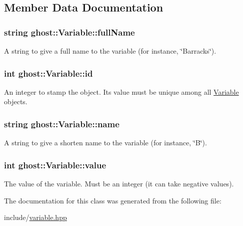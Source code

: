 \subsection{Member Data Documentation}
\hypertarget{classghost_1_1Variable_a87dc1fa73726f887a7ecbd5b9bfa7cab}{
\subsubsection[{full\-Name}]{\setlength{\rightskip}{0pt plus 5cm}string ghost\-::\-Variable\-::full\-Name\hspace{0.3cm}{\ttfamily [protected]}}}\label{classghost_1_1Variable_a87dc1fa73726f887a7ecbd5b9bfa7cab}


A string to give a full name to the variable (for instance, \char`\"{}\-Barracks\char`\"{}). 

\hypertarget{classghost_1_1Variable_a3b1cd0e87cecbb58e115a9000be26f28}{
\subsubsection[{id}]{\setlength{\rightskip}{0pt plus 5cm}int ghost\-::\-Variable\-::id\hspace{0.3cm}{\ttfamily [protected]}}}\label{classghost_1_1Variable_a3b1cd0e87cecbb58e115a9000be26f28}


An integer to stamp the object. Its value must be unique among all \hyperlink{classghost_1_1Variable}{Variable} objects. 

\hypertarget{classghost_1_1Variable_a05cf4a4cd3a5c033028e0b0f11d1dafd}{
\subsubsection[{name}]{\setlength{\rightskip}{0pt plus 5cm}string ghost\-::\-Variable\-::name\hspace{0.3cm}{\ttfamily [protected]}}}\label{classghost_1_1Variable_a05cf4a4cd3a5c033028e0b0f11d1dafd}


A string to give a shorten name to the variable (for instance, \char`\"{}\-B\char`\"{}). 

\hypertarget{classghost_1_1Variable_a4623be8dd7ed2a0cb7033aec42033cb7}{
\subsubsection[{value}]{\setlength{\rightskip}{0pt plus 5cm}int ghost\-::\-Variable\-::value\hspace{0.3cm}{\ttfamily [protected]}}}\label{classghost_1_1Variable_a4623be8dd7ed2a0cb7033aec42033cb7}


The value of the variable. Must be an integer (it can take negative values). 



The documentation for this class was generated from the following file\-:\begin{DoxyCompactItemize}
\item 
include/\hyperlink{variable_8hpp}{variable.\-hpp}\end{DoxyCompactItemize}
